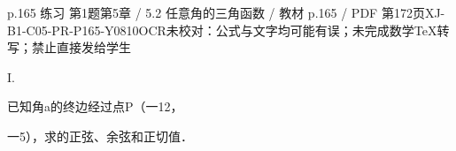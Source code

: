 \begin{bankitem}{p.165 练习 第1题}{第5章 / 5.2 任意角的三角函数 / 教材 p.165 / PDF 第172页}{XJ-B1-C05-PR-P165-Y0810}{OCR未校对：公式与文字均可能有误；未完成数学TeX转写；禁止直接发给学生}
\begin{ocrdraft}
\par
I.
\par
已知角a的终边经过点P（一12，
\par
一5），求的正弦、余弦和正切值．
\end{ocrdraft}
\end{bankitem}
